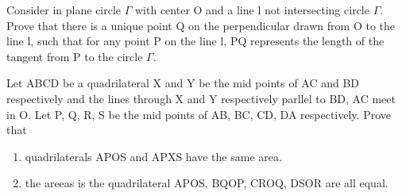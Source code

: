 \item Consider in plane circle $\Gamma$ with center O and a line l not intersecting circle $\Gamma$. Prove that there is a unique point Q on the perpendicular drawn from O to the line l, such that for any point P on the line l, PQ represents the length of the tangent from P to the circle $\Gamma$.

\item Let ABCD be a quadrilateral X and Y be the mid points of AC and BD respectively and the lines through X and Y respectively parllel to BD, AC meet in O. Let P, Q, R, S be the mid points of AB, BC, CD, DA respectively. Prove that
\begin{enumerate}
\item quadrilaterals APOS and APXS have the same area.
\item the areeas is the quadrilateral APOS, BQOP, CROQ, DSOR are all equal. 
\end{enumerate}
